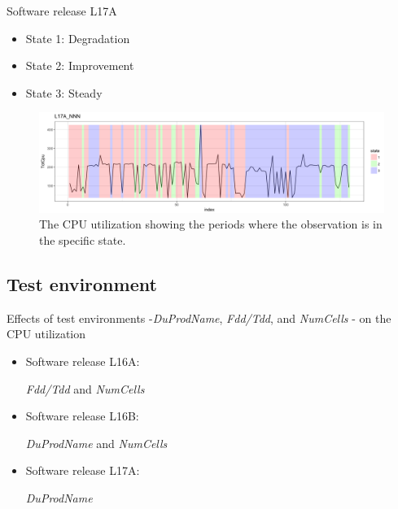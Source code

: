 \documentclass{beamer}
\begin{document}
\begin{frame}
Software release L17A

\begin{itemize}
	\item State 1: Degradation
	\item State 2: Improvement
	\item State 3: Steady
\end{itemize}

\begin{figure}
	\includegraphics[width=1\linewidth]{L17A_NNN1}
	\caption{The CPU utilization showing the periods where the observation is in the specific state.}
\end{figure}

\end{frame}

\subsection{Test environment}
\begin{frame}
Effects of test environments -\textit{DuProdName}, \textit{Fdd/Tdd}, and \textit{NumCells} - on the CPU utilization

\begin{itemize}
	\item Software release L16A:
	
	\textit{Fdd/Tdd} and \textit{NumCells}
	
	\item Software release L16B:
	
	\textit{DuProdName} and \textit{NumCells}
	
	\item Software release L17A:
	
	\textit{DuProdName} 
	
\end{itemize}

\end{frame}

\end{document}
